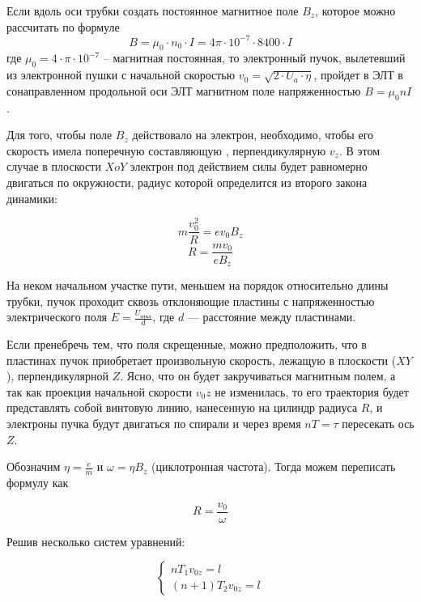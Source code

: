 Если вдоль оси трубки создать постоянное магнитное поле $B_z$, которое можно рассчитать по формуле
\begin{equation}
	B=\mu_0\cdot{}n_0\cdot{}I=4\pi\cdot10^{-7}\cdot8400\cdot{}I
\end{equation}
где $\mu_0=4\cdot\pi\cdot10^{-7}$ -- магнитная постоянная, то электронный пучок, вылетевший из электронной пушки с начальной скоростью $v_0=\sqrt{2\cdot{U_a}\cdot\eta}$, пройдет в ЭЛТ в сонаправленном продольной оси ЭЛТ магнитном поле напряженностью $B=\mu_0nI$. 

Для того, чтобы поле $B_z$ действовало на электрон, необходимо, чтобы его скорость имела поперечную составляющую , перпендикулярную $v_z$. В этом случае в плоскости $XoY$ электрон под действием силы  будет равномерно двигаться по окружности, радиус которой определится из второго закона динамики:

\begin{equation}
	m\frac{v_0^2}{R}=ev_0B_z
\end{equation}
\begin{equation}
	R=\frac{mv_0}{eB_z}
\end{equation}

На неком начальном участке пути, меньшем на порядок относительно длины трубки, пучок проходит сквозь отклоняющие пластины с напряженностью электрического поля $E=\frac{U_\text{откл}}{d}$, где $d$ --- расстояние между пластинами.

Если пренебречь тем, что поля скрещенные, можно предположить, что в пластинах пучок приобретает произвольную скорость, лежащую в плоскости ($XY$), перпендикулярной $Z$. Ясно, что он будет закручиваться магнитным полем, а так как проекция начальной скорости $v_0z$ не изменилась, то
его траектория будет представлять собой винтовую линию, нанесенную на цилиндр радиуса $R$, и электроны пучка будут двигаться по спирали и через время $nT=\tau$ пересекать ось $Z$.

Обозначим $\eta=\frac{e}{m}$ и $\omega=\eta{}B_z$ (циклотронная частота). Тогда можем переписать формулу как

\begin{equation}
	R=\frac{v_0}{\omega}
\end{equation}

Решив несколько систем уравнений:

\begin{equation}
	\begin{cases}
		nT_1v_{0z}=l\\
		(n+1)T_2v_{0z}=l
	\end{cases}	
\end{equation}

